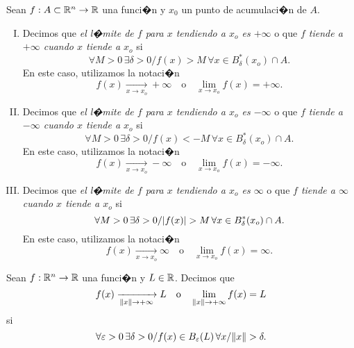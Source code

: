 \documentclass[a4paper]{scrartcl} %
\begin{document}
\begin{definition} \label{def:lim_inf}
  Sean $f : A \subset \mathbb{R}^n \to \mathbb{R}$ una funci�n y $x_0$ un punto de acumulaci�n de $A$. 
  \begin{enumerate} [I.]
   \item Decimos que \emph{el l�mite de $f$ para $x$ tendiendo a $x_o$ es $+\infty$} o que \emph{$f$ tiende a $+\infty$ cuando $x$ tiende a $x_o$} si
    \[
      \forall M > 0 \, \exists \delta > 0 / f(x) > M \, \forall 
	  x \in B_{\delta}^*(x_o) \cap A.
    \]
    En este caso, utilizamos la notaci�n
    \[
      f(x) \xrightarrow[x \to x_o]{} +\infty \quad \text{o} \quad \lim_{x \to x_o} f(x) = +\infty.
    \]
   \item Decimos que \emph{el l�mite de $f$ para $x$ tendiendo a $x_o$ es $-\infty$} o que \emph{$f$ tiende a $-\infty$ cuando $x$ tiende a $x_o$} si
    \[
      \forall M > 0 \, \exists \delta > 0 / f(x) < -M \, \forall 
	  x \in B_{\delta}^*(x_o) \cap A.
    \]
    En este caso, utilizamos la notaci�n
    \[
      f(x) \xrightarrow[x \to x_o]{} -\infty \quad \text{o} \quad \lim_{x \to x_o} f(x) = -\infty.
    \]
   \item Decimos que \emph{el l�mite de $f$ para $x$ tendiendo a $x_o$ es $\infty$} o que \emph{$f$ tiende a $\infty$ cuando $x$ tiende a $x_o$} si
    \[
      \forall M > 0 \, \exists \delta > 0 / \abs{f(x)} > M \, \forall 
	  x \in B_{\delta}^*(x_o) \cap A.
    \]
    En este caso, utilizamos la notaci�n
    \[
      f(x) \xrightarrow[x \to x_o]{} \infty \quad \text{o} \quad \lim_{x \to x_o} f(x) = \infty.
    \]
  \end{enumerate}
\end{definition}

\begin{definition} \label{def:lim_x_inf}
Sean $f : \mathbb{R}^n \to \mathbb{R}$ una funci�n y $L \in \mathbb{R}$. Decimos que
\[
 f(x) \xrightarrow[\norm{x} \to +\infty]{} L \quad \text{o} \quad \lim_{\norm{x} \to +\infty} f(x) = L
\]
si 
\[ 
 \forall \varepsilon > 0 \, \exists \delta > 0 / f(x) \in B_{\varepsilon}(L) \, \forall 
 x / \norm{x} > \delta.
\]
\end{definition}


\iffalse
\begin{propiedad} \label{prop:lim_2}
 Sean $f:A \subset \Rn{m} \to \Rn{m}$, $g:A \to \R$ y $x_0$ un punto de acumulaci�n de $A$, tales que 
 \[
  \lim_{x \to x_o} g(x) = L_g \quad \wedge \quad \lim_{x \to x_o} \left( (f + g)_{(x)} \right) = L.
 \]
 Entonces, existe el l�mite $\lim_{x \to x_o} f(x)$ y, adem�s, $\lim_{x \to x_o} f(x) = L - L_g$.
\end{propiedad}
\fi
\end{document}
